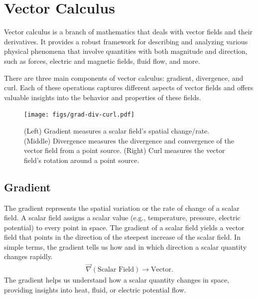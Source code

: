 \documentclass[12pt,b4paper]{article}
\begin{document}
\section*{Vector Calculus}
Vector calculus is a branch of mathematics that deals with vector fields and their derivatives. It provides a robust framework for describing and analyzing various physical phenomena that involve quantities with both magnitude and direction, such as forces, electric and magnetic fields, fluid flow, and more.

There are three main components of vector calculus: gradient, divergence, and curl. Each of these operations captures different aspects of vector fields and offers valuable insights into the behavior and properties of these fields.
\begin{figure}[H]
    \centering
    \texttt{[image: figs/grad-div-curl.pdf]}
    \caption{(Left) Gradient measures a scalar field's spatial change/rate. (Middle) Divergence measures the divergence and convergence of the vector field from a point source. (Right) Curl measures the vector field's rotation around a point source.}
    \label{fig:grad-div-curl}
\end{figure}
\subsection*{Gradient} The gradient represents the spatial variation or the rate of change of a scalar field. A scalar field assigns a scalar value (e.g., temperature, pressure, electric potential) to every point in space. The gradient of a scalar field yields a vector field that points in the direction of the steepest increase of the scalar field. In simple terms, the gradient tells us how and in which direction a scalar quantity changes rapidly.
\begin{align}
    \Vec{\nabla}\left(\text{Scalar Field}\right)\to\text{Vector}.
\end{align}
The gradient helps us understand how a scalar quantity changes in space, providing insights into heat, fluid, or electric potential flow.
\thispagestyle{empty}
\end{document}
